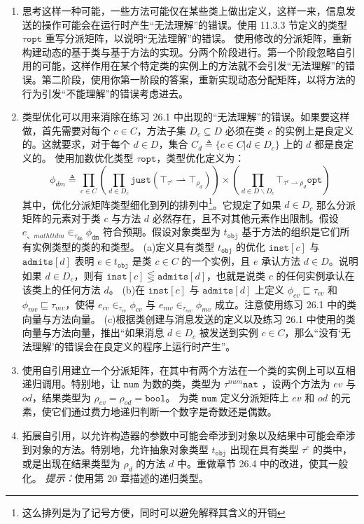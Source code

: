 \begin{enumerate}
\item
思考这样一种可能，一些方法可能仅在某些类上做出定义，这样一来，信息发送的操作可能会在运行时产生“无法理解”的错误。使用 11.3.3 节定义的类型 $\tau \mathtt{opt}$ 重写分派矩阵，以说明“无法理解”的错误。
使用修改的分派矩阵，重新构建动态的基于类与基于方法的实现。分两个阶段进行。第一个阶段忽略自引用的可能，这样作用在某个特定类的实例上的方法就不会引发“无法理解”的错误。第二阶段，使用你第一阶段的答案，重新实现动态分配矩阵，以将方法的行为引发“不能理解”的错误考虑进去。

\item
类型优化可以用来消除在练习 26.1 中出现的“无法理解”的错误。如果要这样做，首先需要对每个 $c \in C$，方法子集 $ D_c \subseteq D $ 必须在类 $c$ 的实例上是良定义的。这就要求，对于每个 $d \in D$，集合 $C_d \triangleq \{ c \in C | d \in D_c\}$ 上的 $d$ 都是良定义的。
使用加数优化类型 $\tau \mathtt{opt}$，类型优化定义为：
$$ \phi_{dm} \triangleq \prod_{c \in C}(\prod_{d \in D_c} \mathtt{just} (\top_{\tau^{c}} \rightharpoonup \top_{\rho_{d}})) \times (\prod_{d \in D \backslash D_c} \top_{\tau^{c} \rightharpoonup \rho_d} \mathtt{opt}) $$
其中，优化分派矩阵类型细化到列的排列中\footnote[3]{这么排列是为了记号方便，同时可以避免解释其含义的开销}。它规定了如果 $d \in D_c$ 那么分派矩阵的元素对于类 $c$ 与方法 $d$ 必然存在，且不对其他元素作出限制。假设 $e_{、mathtt{dm}} \in_{\tau_{\mathtt{dm}}} \phi_{\mathtt{dm}}$ 符合预期。假设对象类型为 $t_{\mathtt{obj}}$ 基于方法的组织是它们所有实例类型的类的和类型。
(a)定义具有类型 $t_{\mathtt{obj}}$ 的优化 $\mathtt{inst}[c]$ 与 $\mathtt{admits}[d]$ 表明 $e \in t_{\mathtt{obj}}$ 是类 $c \in C$ 的一个实例，且 $e$ 承认方法  $d \in D$。说明如果 $d \in D_c$，则有 $\mathtt{inst}[c] \lesseqgtr \mathtt{admits}[d]$，也就是说类 $c$ 的任何实例承认在该类上的任何方法 $d$。
(b)在 $\mathtt{inst}[c]$ 与 $\mathtt{admits}[d]$ 上定义 $\phi_{cv} \sqsubseteq \tau_{cv}$ 和 $\phi_{mv} \sqsubseteq \tau_{mv}$，使得 $e_{cv} \in_{\tau_{cv}} \phi_{cv}$ 与 $ e_{mv} \in_{\tau_{mv}} \phi_{mv} $ 成立。注意使用练习 26.1 中的类向量与方法向量。
(c)根据类创建与消息发送的定义以及练习 26.1 中使用的类向量与方法向量，推出“如果消息 $d \in D_c$ 被发送到实例 $c \in C$，那么“没有‘无法理解’的错误会在良定义的程序上运行时产生”。

\item
使用自引用建立一个分派矩阵，在其中有两个方法在一个类的实例上可以互相递归调用。特别地，让 $\mathtt{num}$ 为数的类，类型为 $\tau^{num} \mathtt{nat}$ ，设两个方法为 $ev$ 与 $od$，结果类型为 $\rho_{ev} = \rho_{od} = \mathtt{bool}$。
为类 $\mathtt{num}$ 定义分派矩阵上 $ev$ 和 $od$ 的元素，使它们通过费力地递归判断一个数字是奇数还是偶数。
\item
拓展自引用，以允许构造器的参数中可能会牵涉到对象以及结果中可能会牵涉到对象的方法。特别地，允许抽象对象类型 $t_{\mathtt{obj}}$ 出现在具有类型 $\tau^{c}$ 的类中，或是出现在结果类型为 $\rho_{d}$ 的方法 $d$ 中。重做章节 26.4 中的改进，使其一般化。
\textit{提示：}使用第 20 章描述的递归类型。

\end{enumerate}
